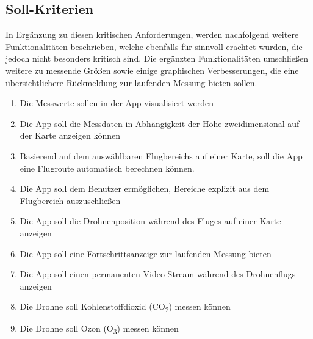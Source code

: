 \subsection{Soll-Kriterien}\label{subsec:SollKrit}
In Ergänzung zu diesen kritischen Anforderungen, werden nachfolgend weitere Funktionalitäten beschrieben, welche ebenfalls für sinnvoll erachtet wurden, die jedoch nicht besonders kritisch sind. Die ergänzten Funktionalitäten umschließen weitere zu messende Größen sowie einige graphischen Verbesserungen, die eine übersichtlichere Rückmeldung zur laufenden Messung bieten sollen.
\newline
\begin{enumerate}[label=\roman*.]
	\item Die Messwerte sollen in der App visualisiert werden 	
	\item Die App soll die Messdaten in Abhängigkeit der Höhe zweidimensional auf der Karte anzeigen können
	\item Basierend auf dem auswählbaren Flugbereichs auf einer Karte, soll die App eine Flugroute automatisch berechnen können.
	\item Die App soll dem Benutzer ermöglichen, Bereiche explizit aus dem Flugbereich auszuschließen
	\item Die App soll die Drohnenposition während des Fluges auf einer Karte anzeigen
	\item Die App soll eine Fortschrittsanzeige zur laufenden Messung bieten
	\item Die App soll einen permanenten Video-Stream während des Drohnenflugs anzeigen
	\item Die Drohne soll Kohlenstoffdioxid (CO\textsubscript{2}) messen können
	\item Die Drohne soll Ozon (O\textsubscript{3}) messen können	
\end{enumerate}
